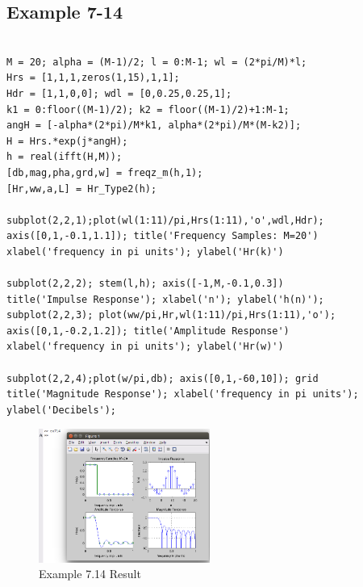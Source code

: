 \documentclass[11pt
  , a4paper
  , article
  , oneside
]{memoir}
\begin{document}
\subsection{Example 7-14}
\begin{lstlisting}[style=termstyle]
% Example 7.14

M = 20; alpha = (M-1)/2; l = 0:M-1; wl = (2*pi/M)*l;
Hrs = [1,1,1,zeros(1,15),1,1];
Hdr = [1,1,0,0]; wdl = [0,0.25,0.25,1];
k1 = 0:floor((M-1)/2); k2 = floor((M-1)/2)+1:M-1;
angH = [-alpha*(2*pi)/M*k1, alpha*(2*pi)/M*(M-k2)];
H = Hrs.*exp(j*angH);
h = real(ifft(H,M));
[db,mag,pha,grd,w] = freqz_m(h,1);
[Hr,ww,a,L] = Hr_Type2(h);

subplot(2,2,1);plot(wl(1:11)/pi,Hrs(1:11),'o',wdl,Hdr); 
axis([0,1,-0.1,1.1]); title('Frequency Samples: M=20')
xlabel('frequency in pi units'); ylabel('Hr(k)')

subplot(2,2,2); stem(l,h); axis([-1,M,-0.1,0.3])
title('Impulse Response'); xlabel('n'); ylabel('h(n)');
subplot(2,2,3); plot(ww/pi,Hr,wl(1:11)/pi,Hrs(1:11),'o');
axis([0,1,-0.2,1.2]); title('Amplitude Response')
xlabel('frequency in pi units'); ylabel('Hr(w)')

subplot(2,2,4);plot(w/pi,db); axis([0,1,-60,10]); grid
title('Magnitude Response'); xlabel('frequency in pi units');
ylabel('Decibels');
\end{lstlisting}

\begin{figure}[h!]
	\centering
	\includegraphics[width=0.5\textwidth,height=0.4\textwidth]{./images/ex714.png}
	\caption{Example 7.14 Result}
	\label{fig:Example 7.14 Result}
\end{figure}

\clearpage
\end{document}
